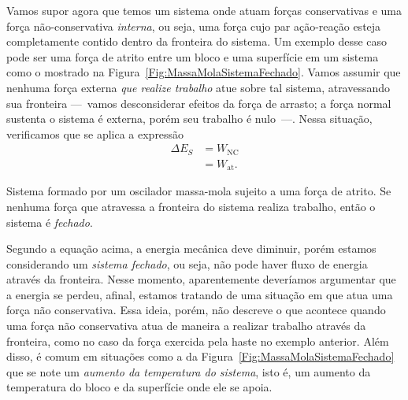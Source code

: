 Vamos supor agora que temos um sistema onde atuam forças conservativas e uma força não-conservativa \emph{interna}, ou seja, uma força cujo par ação-reação esteja completamente contido dentro da fronteira do sistema. Um exemplo desse caso pode ser uma força de atrito entre um bloco e uma superfície em um sistema como o mostrado na Figura~\ref{Fig:MassaMolaSistemaFechado}. Vamos assumir que nenhuma força externa \emph{que realize trabalho} atue sobre tal sistema, atravessando sua fronteira ---~vamos desconsiderar efeitos da força de arrasto; a força normal sustenta o sistema é externa, porém seu trabalho é nulo~---. Nessa situação, verificamos que se aplica a expressão
\begin{align}
    \Delta E_S &= W_{\textrm{NC}} \\
    &= W_{\textrm{at}}.
\end{align}

\begin{marginfigure}
\centering
{}
\caption{Sistema formado por um oscilador massa-mola sujeito a uma força de atrito. Se nenhuma força que atravessa a fronteira do sistema realiza trabalho, então o sistema é \emph{fechado}.\label{Fig:MassaMolaSistemaFechado}}
\end{marginfigure}

Segundo a equação acima, a energia mecânica deve diminuir, porém estamos considerando um \emph{sistema fechado}, ou seja, não pode haver fluxo de energia através da fronteira. Nesse momento, aparentemente deveríamos argumentar que a energia se perdeu, afinal, estamos tratando de uma situação em que atua uma força não conservativa. Essa ideia, porém, não descreve o que acontece quando uma força não conservativa atua de maneira a realizar trabalho através da fronteira, como no caso da força exercida pela haste no exemplo anterior. Além disso, é comum em situações como a da Figura~\ref{Fig:MassaMolaSistemaFechado} que se note um \emph{aumento da temperatura do sistema}, isto é, um aumento da temperatura do bloco e da superfície onde ele se apoia.

